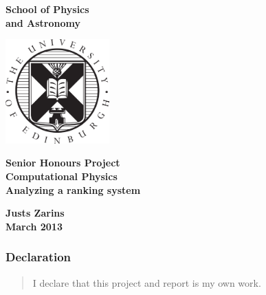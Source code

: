 \documentclass[a4paper,12pt]{article}
\begin{document}
\pagestyle{empty}                       %
\begin{minipage}[b]{110mm}
        {\Huge\bf School of Physics\\ and Astronomy
        \vspace*{17mm}}
\end{minipage}
\hfill
\begin{minipage}[t]{40mm}               
        \includegraphics[width=40mm]{crest.pdf}
\end{minipage}
\par\noindent                                           %
\vspace*{2cm}
\begin{center}
        \Large\bf \Large\bf Senior Honours Project\\
        \Large\bf Computational Physics\\[10pt]                     %
        \LARGE\bf Analyzing a ranking system         %
\end{center}
\vspace*{0.5cm}
\begin{center}
        \bf Justs Zarins\\                           %
        March 2013                                    %
\end{center}
\vspace*{5mm}
                   
\begin{abstract}
       
\end{abstract}

\vspace*{1cm}

\subsubsection*{Declaration}

\begin{quotation}
        I declare that this project and report is my own work.
\end{quotation}
\end{document}
